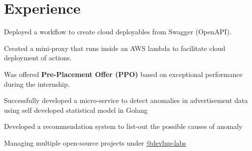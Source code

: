 \documentclass[]{deedy-resume-openfont}
\begin{document}
\begin{minipage}[t]{0.66\textwidth} 


\section{Experience}
\vspace{\topsep} %
\begin{tightemize}
\item Deployed a workflow to create cloud deployables from Swagger (OpenAPI).
\item Created a mini-proxy that runs inside an AWS lambda to facilitate cloud deployment of actions.
\item Was offered \textbf{Pre-Placement Offer (PPO)} based on exceptional performance during the internship.
\end{tightemize}

{}
\begin{tightemize}
\item Successfully developed a micro-service to detect anomalies in advertisement data using self developed statistical model in Golang
\item Developed a recommendation system to list-out the possible causes of anomaly
\end{tightemize}


\begin{tightemize}
\item Managing multiple open-source projects under \href{https://github.com/orgs/devlup-labs/teams?query=\%40hrshAnand}{@devlup-labs \faExternalLink}
\end{tightemize}




\end{minipage}
\end{document}
